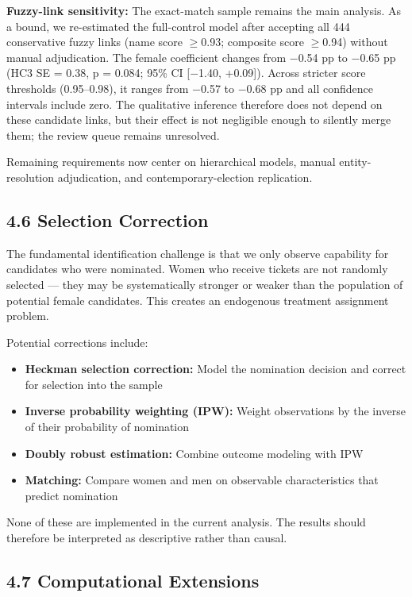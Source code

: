 \documentclass[
]{article}
\providecommand{\tightlist}{%
  \setlength{\itemsep}{0pt}\setlength{\parskip}{0pt}}
\begin{document}
\textbf{Fuzzy-link sensitivity:} The exact-match sample remains the main analysis. As a bound, we re-estimated the full-control model after accepting all 444 conservative fuzzy links (name score $\geq$0.93; composite score $\geq$0.94) without manual adjudication. The female coefficient changes from $-$0.54 pp to $-$0.65 pp (HC3 SE = 0.38, p = 0.084; 95\% CI {[}$-$1.40, +0.09{]}). Across stricter score thresholds (0.95--0.98), it ranges from $-$0.57 to $-$0.68 pp and all confidence intervals include zero. The qualitative inference therefore does not depend on these candidate links, but their effect is not negligible enough to silently merge them; the review queue remains unresolved.

Remaining requirements now center on hierarchical models, manual entity-resolution adjudication, and contemporary-election replication.

\subsection{4.6 Selection Correction}\label{46-selection-correction}

The fundamental identification challenge is that we only observe capability for candidates who were nominated. Women who receive tickets are not randomly selected --- they may be systematically stronger or weaker than the population of potential female candidates. This creates an endogenous treatment assignment problem.

Potential corrections include:

\begin{itemize}
\tightlist
\item
  \textbf{Heckman selection correction:} Model the nomination decision and correct for selection into the sample
\item
  \textbf{Inverse probability weighting (IPW):} Weight observations by the inverse of their probability of nomination
\item
  \textbf{Doubly robust estimation:} Combine outcome modeling with IPW
\item
  \textbf{Matching:} Compare women and men on observable characteristics that predict nomination
\end{itemize}

None of these are implemented in the current analysis. The results should therefore be interpreted as descriptive rather than causal.

\subsection{4.7 Computational Extensions}\label{47-computational-extensions}
\end{document}

